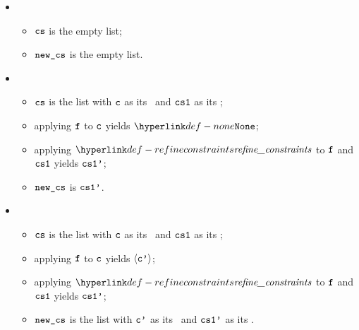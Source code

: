 \ProseParagraph
\OneApplies
\begin{itemize}
  \item {}
  \begin{itemize}
    \item $\cs$ is the empty list;
    \item $\newcs$ is the empty list.
  \end{itemize}

  \item {}
  \begin{itemize}
    \item $\cs$ is the list with $\vc$ as its \head\ and $\csone$ as its \tail;
    \item applying $\vf$ to $\vc$ yields $\None$;
    \item applying $\refineconstraints$ to $\vf$ and $\csone$ yields $\csonep$;
    \item $\newcs$ is $\csonep$.
  \end{itemize}

  \item {}
  \begin{itemize}
    \item $\cs$ is the list with $\vc$ as its \head\ and $\csone$ as its \tail;
    \item applying $\vf$ to $\vc$ yields $\langle\vcp\rangle$;
    \item applying $\refineconstraints$ to $\vf$ and $\csone$ yields $\csonep$;
    \item $\newcs$ is the list with $\vcp$ as its \head\ and $\csonep$ as its \tail.
  \end{itemize}
\end{itemize}

\FormallyParagraph
\begin{mathpar}
\end{mathpar}

\begin{mathpar}
\end{mathpar}

